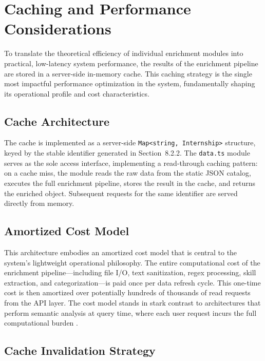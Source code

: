 \section{Caching and Performance Considerations}

To translate the theoretical efficiency of individual enrichment modules into practical, low-latency system performance, the results of the enrichment pipeline are stored in a server-side in-memory cache. This caching strategy is the single most impactful performance optimization in the system, fundamentally shaping its operational profile and cost characteristics.

\subsection{Cache Architecture}

The cache is implemented as a server-side \texttt{Map<string, Internship>} structure, keyed by the stable identifier generated in Section~8.2.2. The \texttt{data.ts} module serves as the sole access interface, implementing a read-through caching pattern: on a cache miss, the module reads the raw data from the static JSON catalog, executes the full enrichment pipeline, stores the result in the cache, and returns the enriched object. Subsequent requests for the same identifier are served directly from memory.

\subsection{Amortized Cost Model}

This architecture embodies an amortized cost model that is central to the system's lightweight operational philosophy. The entire computational cost of the enrichment pipeline—including file I/O, text sanitization, regex processing, skill extraction, and categorization—is paid once per data refresh cycle. This one-time cost is then amortized over potentially hundreds of thousands of read requests from the API layer. The cost model stands in stark contrast to architectures that perform semantic analysis at query time, where each user request incurs the full computational burden \cite{buttcher2016information, menghani2023efficient}.

\subsection{Cache Invalidation Strategy}

